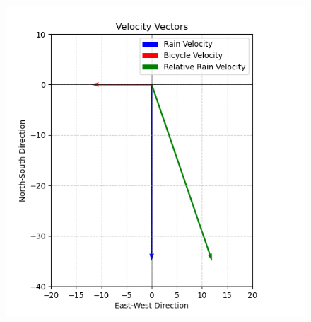 \documentclass[journal]{IEEEtran}
\begin{document}
\begin{figure}[h!]
   \centering
   \includegraphics[width=0.7\linewidth]{figure_1.png}
   \label{stemplot}
\end{figure}
\end{document}
